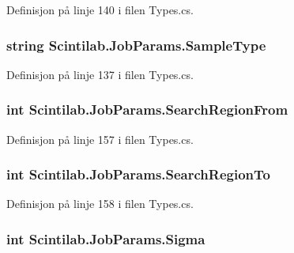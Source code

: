 Definisjon på linje 140 i filen Types.\+cs.

\hypertarget{class_scintilab_1_1_job_params_a92d7bef1d796fda654dd39c5d8e09bd0}{
\subsubsection[{Sample\+Type}]{\setlength{\rightskip}{0pt plus 5cm}string Scintilab.\+Job\+Params.\+Sample\+Type}}\label{class_scintilab_1_1_job_params_a92d7bef1d796fda654dd39c5d8e09bd0}


Definisjon på linje 137 i filen Types.\+cs.

\hypertarget{class_scintilab_1_1_job_params_a46a6e6cb9c2a2e15c97de85a5169cb95}{
\subsubsection[{Search\+Region\+From}]{\setlength{\rightskip}{0pt plus 5cm}int Scintilab.\+Job\+Params.\+Search\+Region\+From}}\label{class_scintilab_1_1_job_params_a46a6e6cb9c2a2e15c97de85a5169cb95}


Definisjon på linje 157 i filen Types.\+cs.

\hypertarget{class_scintilab_1_1_job_params_aa348a43e8264d89a2f47c352df726fd8}{
\subsubsection[{Search\+Region\+To}]{\setlength{\rightskip}{0pt plus 5cm}int Scintilab.\+Job\+Params.\+Search\+Region\+To}}\label{class_scintilab_1_1_job_params_aa348a43e8264d89a2f47c352df726fd8}


Definisjon på linje 158 i filen Types.\+cs.

\hypertarget{class_scintilab_1_1_job_params_a54ccd1ff53de6e2bd371c0fd61360193}{
\subsubsection[{Sigma}]{\setlength{\rightskip}{0pt plus 5cm}int Scintilab.\+Job\+Params.\+Sigma}}\label{class_scintilab_1_1_job_params_a54ccd1ff53de6e2bd371c0fd61360193}


